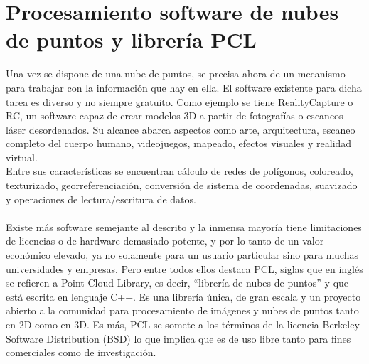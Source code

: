 \section{Procesamiento software de nubes de puntos y librería PCL}\label{librerias}
Una vez se dispone de una nube de puntos, se precisa ahora de un mecanismo para trabajar con la información que hay en ella. El software existente para dicha tarea es diverso y no siempre gratuito. Como ejemplo se tiene RealityCapture\cite{realitycapture} o RC, un software capaz de crear modelos 3D a partir de fotografías o escaneos láser desordenados. Su alcance abarca aspectos como arte, arquitectura, escaneo completo del cuerpo humano, videojuegos, mapeado, efectos visuales y realidad virtual.
\\
Entre sus características se encuentran cálculo de redes de polígonos, coloreado, texturizado, georreferenciación, conversión de sistema de coordenadas, suavizado y operaciones de lectura/escritura de datos.
\\
\\
Existe más software semejante al descrito y la inmensa mayoría tiene limitaciones de licencias o de hardware demasiado potente, y por lo tanto de un valor económico elevado, ya no solamente para un usuario particular sino para muchas universidades y empresas. Pero entre todos ellos destaca PCL, siglas que en inglés se refieren a Point Cloud Library\cite{PCL}, es decir, ``librería de nubes de puntos'' y que está escrita en lenguaje C++. Es una librería única, de gran escala y un proyecto abierto a la comunidad para procesamiento de imágenes y nubes de puntos tanto en 2D como en 3D. Es más, PCL se somete a los términos de la licencia Berkeley Software Distribution (BSD) lo que implica que es de uso libre tanto para fines comerciales como de investigación. 

